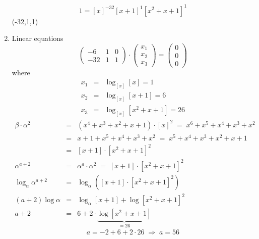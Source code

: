 \documentclass[a4paper]{scrreprt}
\begin{document}
\begin{enumerate}
        \[1=[x]^{-32}[x+1]^1[x^2+x+1]^1\]
        (-32,1,1)
    \item Linear equations
    \[\begin{pmatrix}-6&1&0\\-32&1&1\end{pmatrix}\cdot\begin{pmatrix}x_1\\x_2\\x_3\end{pmatrix}
    =\begin{pmatrix}0\\0\\0\end{pmatrix}\]
        where \begin{eqnarray*}
            x_1&=&\log_{[x]}[x]=1\\
            x_2&=&\log_{[x]}[x+1]=6\\
            x_3&=&\log_{[x]}[x^2+x+1]=26
        \end{eqnarray*}
    \begin{eqnarray*}
        \beta\cdot\alpha^2 &=& (x^4+x^3+x^2+x+1)\cdot[x]^2
                           \;=\; x^6+x^5+x^4+x^3+x^2\\
                           &=& x+1+x^5+x^4+x^3+x^2
                           \;=\; x^5+x^4+x^3+x^2+x+1\\
                           &=& [x+1]\cdot[x^2+x+1]^2\\
        \alpha^{a+2} &=& \alpha^a\cdot\alpha^2 \;=\; [x+1]\cdot[x^2+x+1]^2\\
        \log_\alpha\alpha^{a+2} &=& \log_\alpha([x+1]\cdot[x^2+x+1]^2)\\
        (a+2)\log\alpha &=& \log_\alpha[x+1]+\log[x^2+x+1]^2\\
        a+2 &=&  6+2\cdot\underbrace{\log[x^2+x+1]}_{=26}
    \end{eqnarray*}
    \[a=-2+6+2\cdot26\;\Rightarrow\; a=56\]
\end{enumerate}
\end{document}
